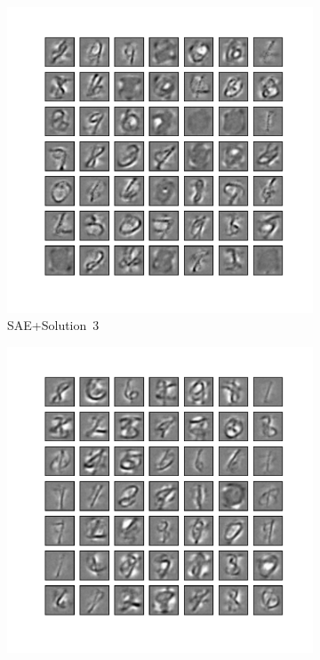 \begin{figure}
\begin{subfigure}[t]{0.4\textwidth}
	\end{subfigure}\\
	\begin{subfigure}[t]{0.4\textwidth}
		\includegraphics[width=\textwidth]{pics_sdlm/41_MNIST_SAE_teach/2_60000_0.pdf}
		\caption{SAE+Solution~3}
	\end{subfigure}
	\begin{subfigure}[t]{0.4\textwidth}
		\includegraphics[width=\textwidth]{pics_sdlm/43_MNIST_SAE_all/2_60000_0.pdf}

\end{subfigure}
\end{figure}
